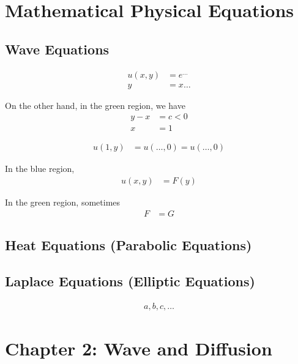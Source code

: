 \documentclass[11pt]{article}
\begin{document}


\clearpage

\section*{Mathematical Physical Equations}

\subsection*{Wave Equations}

\begin{align*}
    u(x, y) &= e^{\ldots} \\
    y &= x \ldots
\end{align*}

On the other hand, in the green region, we have
\begin{align*}
    y - x &= c < 0 \\
    x &= 1
\end{align*}

\begin{align*}
    u(1, y) &= u(\ldots, 0) = u(\ldots, 0)
\end{align*}

In the blue region,
\begin{align*}
    u(x, y) &= F(y)
\end{align*}

In the green region, sometimes
\begin{align*}
    F &= G
\end{align*}

\subsection*{Heat Equations (Parabolic Equations)}

\subsection*{Laplace Equations (Elliptic Equations)}

\begin{align*}
    a, b, c, \ldots
\end{align*}



\clearpage

\section*{Chapter 2: Wave and Diffusion}
\end{document}
